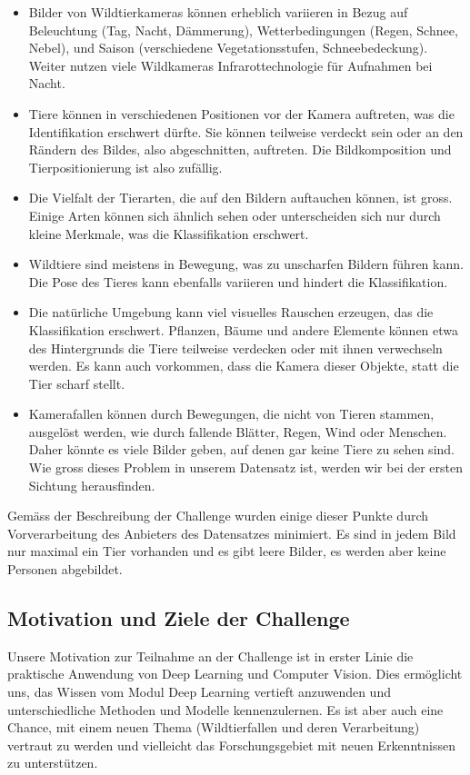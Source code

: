 \documentclass{article}
\begin{document}
\begin{itemize}
 \item Bilder von Wildtierkameras können erheblich variieren in Bezug auf Beleuchtung (Tag, Nacht, Dämmerung), Wetterbedingungen (Regen, Schnee, Nebel), und Saison (verschiedene Vegetationsstufen, Schneebedeckung). Weiter nutzen viele Wildkameras Infrarottechnologie für Aufnahmen bei Nacht. 

 \item Tiere können in verschiedenen Positionen vor der Kamera auftreten, was die Identifikation erschwert dürfte. Sie können teilweise verdeckt sein oder an den Rändern des Bildes, also abgeschnitten, auftreten. Die Bildkomposition und Tierpositionierung ist also zufällig.

 \item Die Vielfalt der Tierarten, die auf den Bildern auftauchen können, ist gross. Einige Arten können sich ähnlich sehen oder unterscheiden sich nur durch kleine Merkmale, was die Klassifikation erschwert.

 \item Wildtiere sind meistens in Bewegung, was zu unscharfen Bildern führen kann. Die Pose des Tieres kann ebenfalls variieren und hindert die Klassifikation.

 \item Die natürliche Umgebung kann viel visuelles Rauschen erzeugen, das die Klassifikation erschwert. Pflanzen, Bäume und andere Elemente können etwa des Hintergrunds die Tiere teilweise verdecken oder mit ihnen verwechseln werden. Es kann auch vorkommen, dass die Kamera dieser Objekte, statt die Tier scharf stellt.

 \item Kamerafallen können durch Bewegungen, die nicht von Tieren stammen, ausgelöst werden, wie durch fallende Blätter, Regen, Wind oder Menschen. Daher könnte es viele Bilder geben, auf denen gar keine Tiere zu sehen sind. Wie gross dieses Problem in unserem Datensatz ist, werden wir bei der ersten Sichtung herausfinden.

\end{itemize}

\noindent
Gemäss der Beschreibung der Challenge wurden einige dieser Punkte durch Vorverarbeitung des Anbieters des Datensatzes minimiert. Es sind in jedem Bild nur maximal ein Tier vorhanden und es gibt leere Bilder, es werden aber keine Personen abgebildet.

\newpage
\subsection{Motivation und Ziele der Challenge}
Unsere Motivation zur Teilnahme an der Challenge ist in erster Linie die praktische Anwendung von Deep Learning und Computer Vision. Dies ermöglicht uns, das Wissen vom Modul Deep Learning vertieft anzuwenden und unterschiedliche Methoden und Modelle kennenzulernen. Es ist aber auch eine Chance, mit einem neuen Thema (Wildtierfallen und deren Verarbeitung) vertraut zu werden und vielleicht das Forschungsgebiet mit neuen Erkenntnissen zu unterstützen.
\end{document}
